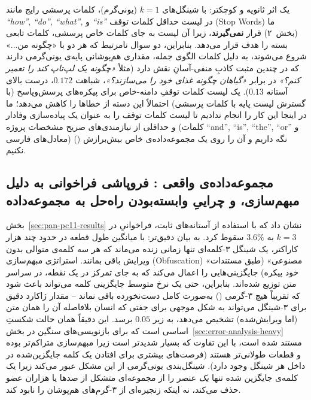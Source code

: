 \documentclass[11pt,a4paper]{article}
\begin{document}
	یک اثر ثانویه و کوچکتر: با شینگل‌های $k=1$ (یونی‌گرم)، کلمات پرسشی رایج مانند \emph{``how''}, \emph{``do''}, \emph{``what''}, و \emph{``is''} در لیست حداقل کلمات توقف (Stop Words) ما (بخش~۲) قرار \textbf{نمی‌گیرند}، زیرا آن لیست به جای کلمات خاص پرسشی، کلمات تابعی بسته را هدف قرار می‌دهد. بنابراین، دو سوال نامرتبط که هر دو با «چگونه من...» شروع می‌شوند، به دلیل کلمات الگوی جمله، مقداری هم‌پوشانی پایه‌ی یونی‌گرمی دارند که در چندین مثبت کاذبِ منفی-آسانِ  نقش دارد (مثلاً \emph{«چگونه یک لپ‌تاپ کند را تعمیر کنم؟»} در برابر \emph{«گیاهان چگونه غذای خود را می‌سازند؟»}، شباهت $0.172$، درست بالای آستانه $0.13$). یک لیست کلمات توقفِ دامنه-خاص برای پیکره‌های پرسش‌وپاسخ (با گسترش لیست پایه با کلمات پرسشی) احتمالاً این دسته از خطاها را کاهش می‌دهد؛ ما در اینجا این کار را انجام ندادیم تا لیست کلمات توقف را به عنوان یک پیاده‌سازی وفادار و حداقلی از نیازمندی‌های صریح مشخصات پروژه (کلمات ``and'', ``is'', ``the'', ``or'' و معادل‌های فارسی) نگه داریم و آن را روی یک مجموعه‌داده‌ی خاص بیش‌برازش () نکنیم.
	
	\subsection{مجموعه‌داده‌ی واقعی : فروپاشی فراخوانی به دلیل مبهم‌سازی، و چراییِ وابسته‌بودن راه‌حل به مجموعه‌داده}
	\label{sec:error-analysis-pan}
	
	بخش~\ref{sec:pan-pc11-results} نشان داد که با استفاده از آستانه‌های ثابت، فراخوانیِ  در $k=3$ به $3.6\%$ سقوط کرد. به بیان دقیق‌تر: با میانگین طول قطعه در حدود چند هزار کاراکتر، یک شینگل ۳-کلمه‌ای تنها زمانی زنده می‌ماند که هر سه کلمه‌ی متوالی بدون ویرایش باقی بمانند. استراتژی مبهم‌سازی (Obfuscation) «مصنوعی»  (طبق مستندات خود پیکره) جایگزینی‌هایی را اعمال می‌کند که به جای تمرکز در یک نقطه، در سراسر متن توزیع شده‌اند. بنابراین، حتی یک نرخ متوسط جایگزینی کلمه می‌تواند باعث شود که تقریباً هیچ ۳-گرمی () به‌صورت کامل دست‌نخورده باقی نماند -- مقدار ژاکارد دقیق برای ۳-شینگل می‌تواند به شکل موجهی برای جفتی که انسان بلافاصله آن را همان متن (اما ویرایش‌شده) تشخیص می‌دهد، به زیر $0.05$ برسد. این دقیقاً همان حالت شکستِ اساسی است که برای بازنویسی‌های سنگین در بخش~\ref{sec:error-analysis-heavy} مستند شده است، با این تفاوت که بسیار شدیدتر است زیرا مبهم‌سازی  متراکم‌تر بوده و قطعات طولانی‌تر هستند (فرصت‌های بیشتری برای افتادن یک کلمه جایگزین‌شده در داخل هر شینگل وجود دارد). شینگل‌بندی یونی‌گرمی از این مشکل عبور می‌کند زیرا یک کلمه‌ی جایگزین شده تنها \emph{یک} عنصر را از مجموعه‌ای متشکل از صدها یا هزاران عضو حذف می‌کند، نه اینکه زنجیره‌ای از ۳-گرم‌های هم‌پوشان را نابود کند.
	
\end{document}
